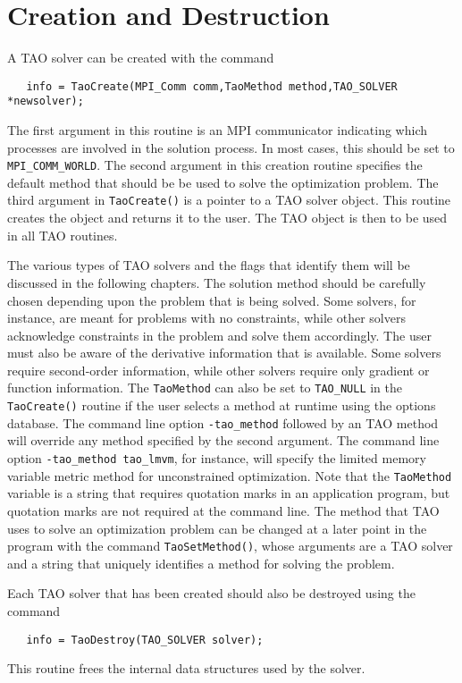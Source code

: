 \section{Creation and Destruction}

A TAO solver can be created with
the command 
\begin{verbatim}
   info = TaoCreate(MPI_Comm comm,TaoMethod method,TAO_SOLVER *newsolver);
\end{verbatim}
\noindent
The first argument in this routine is an MPI communicator indicating which
processes are involved in the solution process.  In
most cases, this should be set to {\tt MPI\_COMM\_WORLD}.
The second argument in this creation routine 
specifies the default method that should be be used to
solve the optimization problem.  
The third argument in {\tt TaoCreate()} is a pointer to a TAO solver
object.  This routine creates the object and returns it to the user.
The TAO object is then to be used in all TAO routines.

The various types of TAO solvers and the flags that identify them 
will be discussed in the following chapters.
The solution method should be carefully chosen depending upon
the problem that is being solved.  Some solvers, for instance, are meant for
problems with no constraints, while other solvers acknowledge constraints
in the problem and solve them accordingly.
The user must also be aware of the derivative information that is available.
Some solvers require second-order information, while other solvers require
only gradient or function information.
The {\tt TaoMethod} can also be set to {\tt TAO\_NULL} in the 
{\tt TaoCreate()} routine if the user selects a method at runtime using
the options database.
The command line option \texttt{-tao\_method} followed by an TAO method
will override any method specified by the second argument.
The command line option {\tt -tao\_method tao\_lmvm}, for instance,
will specify the limited memory variable metric method for unconstrained
optimization.  Note that the {\tt TaoMethod} variable is a string that requires
quotation marks in an application program, but quotation marks are not required
at the command line.
The method that TAO uses to solve an optimization problem can be changed at a later point
in the program with the command
 {\tt TaoSetMethod()}, whose
arguments are a TAO solver
and a string that uniquely identifies a method for solving the problem.

Each TAO solver that has been created should also be destroyed using
the command 
\begin{verbatim}
   info = TaoDestroy(TAO_SOLVER solver);
\end{verbatim}
\noindent 
This routine frees the internal data structures used by the solver.


